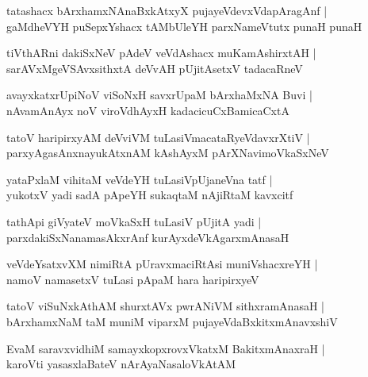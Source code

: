 \documentclass[twoside,12pt,openright]{book}
\newcounter{shloka}[chapter]
\begin{document}
\begin{shloka}%
tatashacx bArxhamxNAnaBxkAtxyX pujayeVdevxVdapAragAnf |\\
gaMdheVYH puSepxYshacx tAMbUleYH parxNameVtutx punaH punaH 
\end{shloka}

\begin{shloka}%
tiVthARni dakiSxNeV pAdeV veVdAshacx muKamAshirxtAH |\\
sarAVxMgeVSAvxsithxtA deVvAH pUjitAsetxV tadacaRneV 
\end{shloka}

\begin{shloka}%
avayxkatxrUpiNoV viSoNxH savxrUpaM bArxhaMxNA Buvi |\\
nAvamAnAyx noV viroVdhAyxH kadacicuCxBamicaCxtA
\end{shloka}

\begin{shloka}%
tatoV haripirxyAM deVviVM tuLasiVmacataRyeVdavxrXtiV |\\
parxyAgasAnxnayukAtxnAM kAshAyxM pArXNavimoVkaSxNeV 
\end{shloka}

\begin{shloka}%
yataPxlaM vihitaM veVdeYH tuLasiVpUjaneVna tatf |\\
yukotxV yadi sadA pApeYH sukaqtaM nAjiRtaM kavxcitf
\end{shloka}

\begin{shloka}%
tathApi giVyateV moVkaSxH tuLasiV pUjitA yadi |\\
parxdakiSxNanamasAkxrAnf kurAyxdeVkAgarxmAnasaH 
\end{shloka}

\begin{shloka}%
veVdeYsatxvXM nimiRtA pUravxmaciRtAsi muniVshacxreYH |\\
namoV namasetxV tuLasi pApaM hara haripirxyeV 
\end{shloka}

\begin{shloka}%
tatoV viSuNxkAthAM shurxtAVx pwrANiVM sithxramAnasaH |\\
bArxhamxNaM taM muniM viparxM pujayeVdaBxkitxmAnavxshiV 
\end{shloka}

\begin{shloka}%
EvaM saravxvidhiM samayxkopxrovxVkatxM BakitxmAnaxraH |\\
karoVti yasasxlaBateV nArAyaNasaloVkAtAM 
\end{shloka}
\end{document}

